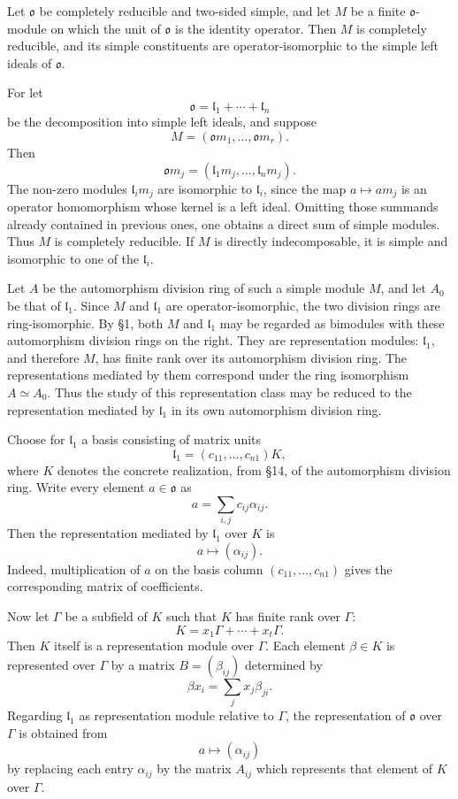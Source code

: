 \documentclass[11pt]{article}
\begin{document}
Let \(\mathfrak{o}\) be completely reducible and two-sided simple, and
let \(M\) be a finite \(\mathfrak{o}\)-module on which the unit of
\(\mathfrak{o}\) is the identity operator. Then \(M\) is completely
reducible, and its simple constituents are operator-isomorphic to the
simple left ideals of \(\mathfrak{o}\).

For let \[
  \mathfrak{o}=\mathfrak l_1+\cdots+\mathfrak l_n
\] be the decomposition into simple left ideals, and suppose \[
  M=(\mathfrak{o}m_1,\ldots,\mathfrak{o}m_r).
\] Then \[
  \mathfrak{o}m_j=(\mathfrak l_1m_j,\ldots,\mathfrak l_nm_j).
\] The non-zero modules \(\mathfrak l_i m_j\) are isomorphic to
\(\mathfrak l_i\), since the map \(a\mapsto am_j\) is an operator
homomorphism whose kernel is a left ideal. Omitting those summands
already contained in previous ones, one obtains a direct sum of simple
modules. Thus \(M\) is completely reducible. If \(M\) is directly
indecomposable, it is simple and isomorphic to one of the
\(\mathfrak l_i\).

Let \(A\) be the automorphism division ring of such a simple module
\(M\), and let \(A_0\) be that of \(\mathfrak l_1\). Since \(M\) and
\(\mathfrak l_1\) are operator-isomorphic, the two division rings are
ring-isomorphic. By §1, both \(M\) and \(\mathfrak l_1\) may be regarded
as bimodules with these automorphism division rings on the right. They
are representation modules: \(\mathfrak l_1\), and therefore \(M\), has
finite rank over its automorphism division ring. The representations
mediated by them correspond under the ring isomorphism \(A\simeq A_0\).
Thus the study of this representation class may be reduced to the
representation mediated by \(\mathfrak l_1\) in its own automorphism
division ring.

Choose for \(\mathfrak l_1\) a basis consisting of matrix units \[
  \mathfrak l_1=(c_{11},\ldots,c_{n1})K,
\] where \(K\) denotes the concrete realization, from §14, of the
automorphism division ring. Write every element \(a\in\mathfrak{o}\) as
\[
  a=\sum_{i,j} c_{ij}\alpha_{ij}.
\] Then the representation mediated by \(\mathfrak l_1\) over \(K\) is
\[
  a\mapsto (\alpha_{ij}).
\] Indeed, multiplication of \(a\) on the basis column
\((c_{11},\ldots,c_{n1})\) gives the corresponding matrix of
coefficients.

Now let \(\Gamma\) be a subfield of \(K\) such that \(K\) has finite
rank over \(\Gamma\): \[
  K=x_1\Gamma+\cdots+x_t\Gamma.
\] Then \(K\) itself is a representation module over \(\Gamma\). Each
element \(\beta\in K\) is represented over \(\Gamma\) by a matrix
\(B=(\beta_{ij})\) determined by \[
  \beta x_i=\sum_j x_j\beta_{ji}.
\] Regarding \(\mathfrak l_1\) as representation module relative to
\(\Gamma\), the representation of \(\mathfrak{o}\) over \(\Gamma\) is
obtained from \[
  a\mapsto (\alpha_{ij})
\] by replacing each entry \(\alpha_{ij}\) by the matrix \(A_{ij}\)
which represents that element of \(K\) over \(\Gamma\).
\end{document}
